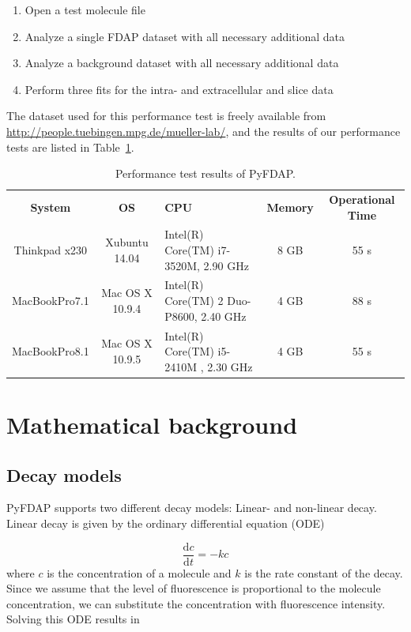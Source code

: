 \documentclass[a4paper,11pt]{article}
\begin{document}
\begin{enumerate}
 \item Open a test molecule file
 \item Analyze a single FDAP dataset with all necessary additional data
 \item Analyze a background dataset with all necessary additional data
 \item Perform three fits for the intra- and extracellular and slice data
\end{enumerate}

\noindent The dataset used for this performance test is freely available from \url{http://people.tuebingen.mpg.de/mueller-lab/}, and the results of our performance tests are listed in Table~\ref{tab:time}.

\begin{table} [H]
  \small
  \centering
 \begin{tabular}{c|c|p{4cm}|c|c}
\textbf{System} & \textbf{OS} & \textbf{CPU} & \textbf{Memory} & \textbf{Operational Time} \\
 \hhline{=|=|=|=|=}
Thinkpad x230 & Xubuntu 14.04 & \centering Intel(R) Core(TM) i7-3520M, 2.90 GHz & 8 GB & 55 s \\
\hline
MacBookPro7.1 & Mac OS X 10.9.4 & \centering  Intel(R) Core(TM) 2 Duo-P8600, 2.40 GHz & 4 GB & 88 s \\
\hline
MacBookPro8.1 & Mac OS X 10.9.5 & \centering  Intel(R) Core(TM) i5-2410M , 2.30 GHz & 4 GB & 55 s \\
\end{tabular}
\caption{Performance test results of PyFDAP.}
\label{tab:time}
\end{table} 

\section{Mathematical background}

\subsection{Decay models}
\label{sec:models}
PyFDAP supports two different decay models: Linear- and non-linear decay. Linear decay is given by the ordinary differential equation (ODE)

\begin{equation*}
 \frac{\mathrm{d}c}{\mathrm{d}t} = -k c
\end{equation*}
\noindent where $c$ is the concentration of a molecule and $k$ is the rate constant of the decay. Since we assume that the level of fluorescence is proportional to the molecule concentration, we can substitute the concentration with fluorescence intensity. Solving this ODE results in 
\end{document}
